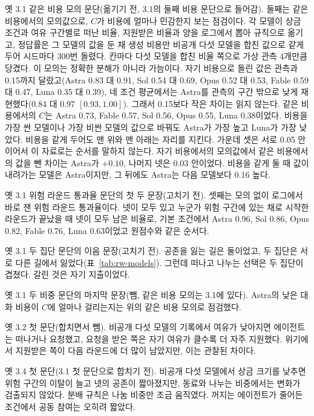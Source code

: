 옛 3.1 같은 비용 모의 문단(옮기기 전, 3.1의 둘째 비용 문단으로 들어감).
둘째는 같은 비용에서의 모의값으로, $C$가 비용에 얼마나 민감한지 보는 점검이다. 각 모델이 상금 조건과 여유 구간별로 떠난 비율, 지원받은 비율과 양을 로그에서 뽑아 규칙으로 옮기고, 정답률은 그 모델의 값을 둔 채 생성 비용만 비공개 다섯 모델을 합친 값으로 같게 두어 시드마다 300번 돌렸다. 칸마다 다섯 모델을 합친 비율 쪽으로 가상 관측 4개만큼 당겼다. 이 모의는 정확한 분해가 아니라 가늠이다. 자기 비용으로 돌린 값은 관측과 0.15까지 달랐고(Astra 0.83 대 0.91, Sol 0.54 대 0.69, Opus 0.52 대 0.53, Fable 0.59 대 0.47, Luna 0.35 대 0.39), 네 조건 평균에서는 Astra를 관측의 구간 밖으로 낮게 재현했다(0.84 대 0.97 $[0.93,1.00]$). 그래서 0.15보다 작은 차이는 읽지 않는다. 같은 비용에서의 $C$는 Astra 0.73, Fable 0.57, Sol 0.56, Opus 0.55, Luna 0.38이었다. 비용을 가장 싼 모델이나 가장 비싼 모델의 값으로 바꿔도 Astra가 가장 높고 Luna가 가장 낮았다. 비용을 같게 두어도 맨 위와 맨 아래는 자리를 지킨다. 가운데 셋은 서로 0.05 안이어서 이 자료로는 순서를 말하지 않는다. 자기 비용에서의 모의값에서 같은 비용에서의 값을 뺀 차이는 Astra가 $+0.10$, 나머지 넷은 0.03 안이었다. 비용을 같게 둘 때 값이 내려가는 모델은 Astra이지만, 그 뒤에도 Astra는 다음 모델보다 0.16 높다.

옛 3.1 위험 라운드 통과율 문단의 첫 두 문장(고치기 전).
셋째는 모의 없이 로그에서 바로 잰 위험 라운드 통과율이다. 넷이 모두 있고 누군가 위험 구간에 있는 채로 시작한 라운드가 끝났을 때 넷이 모두 남은 비율로, 기본 조건에서 Astra 0.96, Sol 0.86, Opus 0.82, Fable 0.76, Luna 0.63이었고 원점수와 같은 순서다.

옛 3.1 두 집단 문단의 이음 문장(고치기 전).
공존을 잃는 길은 둘이었고, 두 집단은 서로 다른 길에서 잃었다(표~\ref{tab:rw-models}). 그런데 떠나고 나누는 선택은 두 집단이 겹쳤다. 갈린 것은 자기 지출이었다.

옛 3.1 두 비중 문단의 마지막 문장(뺌, 같은 비용 모의는 3.1에 있다).
Astra의 낮은 대화 비용이 $C$에 얼마나 걸리는지는 위의 같은 비용 모의로 점검했다.

옛 3.2 첫 문단(합치면서 뺌).
비공개 다섯 모델의 기록에서 여유가 낮아지면 에이전트는 떠나거나 요청했고, 요청을 받은 쪽은 자기 여유가 클수록 더 자주 지원했다. 위기에서 지원받은 쪽이 다음 라운드에 더 많이 남았지만, 이는 관찰된 차이다.

옛 3.4 첫 문단(3.1 첫 문단으로 합치기 전).
비공개 다섯 모델에서 상금 크기를 낮추면 위험 구간의 이탈이 늘고 넷의 공존이 짧아졌지만, 동료와 나누는 비중에서는 변화가 검출되지 않았다. 분배 규칙은 나눔 비중만 조금 움직였다. 꺼지는 에이전트가 줄어든 조건에서 공동 참여는 오히려 짧았다.

